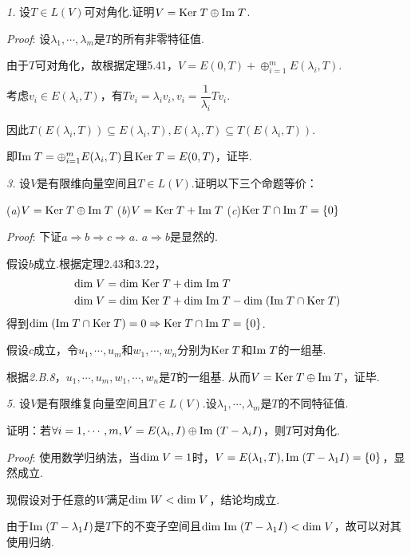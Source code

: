\textit{1.}
设\(T \in L(V)\)可对角化.证明\(V=\mathrm{Ker \;} T \oplus \mathrm{Im \;} T\).

\textit{Proof}:
设\(\lambda_1,\cdots,\lambda_m\)是\(T\)的所有非零特征值.

由于\(T\)可对角化，故根据定理5.41，\(V=E(0,T)+\oplus_{i=1}^m E(\lambda_i,T)\).

考虑\(v_i \in E(\lambda_i,T)\)，有\(Tv_i=\lambda_iv_i,v_i=\dfrac{1}{\lambda_i}Tv_i\).

因此\(T(E(\lambda_i,T)) \subseteq E(\lambda_i,T),E(\lambda_i,T) \subseteq T(E(\lambda_i,T))\).

即\(\mathrm{Im \;} T=\oplus_{i=1}^m E(\lambda_i,T)\)且\(\mathrm{Ker \;} T=E(0,T)\)，证毕.

\hspace*{\fill}

\textit{3.}
设\(V\)是有限维向量空间且\(T \in L(V)\).证明以下三个命题等价：

(\textit{a})\(V=\mathrm{Ker \;} T \oplus \mathrm{Im \;} T\) \quad
(\textit{b})\(V=\mathrm{Ker \;} T+\mathrm{Im \;} T\) \quad
(\textit{c})\(\mathrm{Ker \;} T \cap \mathrm{Im \;} T=\{0\}\)

\textit{Proof}:
下证\(a \Rightarrow b \Rightarrow c \Rightarrow a\).
\(a \Rightarrow b\)是显然的.

假设\(b\)成立.根据定理2.43和3.22，
    \begin{align*}
        \mathrm{dim \;} V &= \mathrm{dim \;} \mathrm{Ker \;} T+\mathrm{dim \;} \mathrm{Im \;} T \\
        \mathrm{dim \;} V &= \mathrm{dim \;} \mathrm{Ker \;} T+\mathrm{dim \;} \mathrm{Im \;} T-\mathrm{dim \;} (\mathrm{Im \;} T \cap \mathrm{Ker \;} T)
    \end{align*}
得到\(\mathrm{dim \;} (\mathrm{Im \;} T \cap \mathrm{Ker \;} T)=0 \Rightarrow \mathrm{Ker \;} T \cap \mathrm{Im \;} T=\{0\}\).

假设\(c\)成立，令\(u_1,\cdots,u_m\)和\(w_1,\cdots,w_n\)分别为\(\mathrm{Ker \;} T\)和\(\mathrm{Im \;} T\)的一组基.

根据\textit{2.B.8}，\(u_1,\cdots,u_m,w_1,\cdots,w_n\)是\(T\)的一组基.
从而\(V=\mathrm{Ker \;} T \oplus \mathrm{Im \;} T\)，证毕.

\hspace*{\fill}

\textit{5.}
设\(V\)是有限维复向量空间且\(T \in L(V)\).设\(\lambda_1,\cdots,\lambda_m\)是\(T\)的不同特征值.

证明：若\(\forall i=1,\cdots,m,V=E(\lambda_i,I) \oplus \mathrm{Im \;}(T-\lambda_i I)\)，则\(T\)可对角化.

\textit{Proof}:
使用数学归纳法，当\(\mathrm{dim \;} V=1\)时，\(V=E(\lambda_1,T),\mathrm{Im \;}(T-\lambda_1 I)=\{0\}\)，显然成立.

现假设对于任意的\(W\)满足\(\mathrm{dim \;} W<\mathrm{dim \;} V\)，结论均成立.

由于\(\mathrm{Im \;}(T-\lambda_1 I)\)是\(T\)下的不变子空间且\(\mathrm{dim \;} \mathrm{Im \;}(T-\lambda_1 I)<\mathrm{dim \;} V\)，故可以对其使用归纳.

